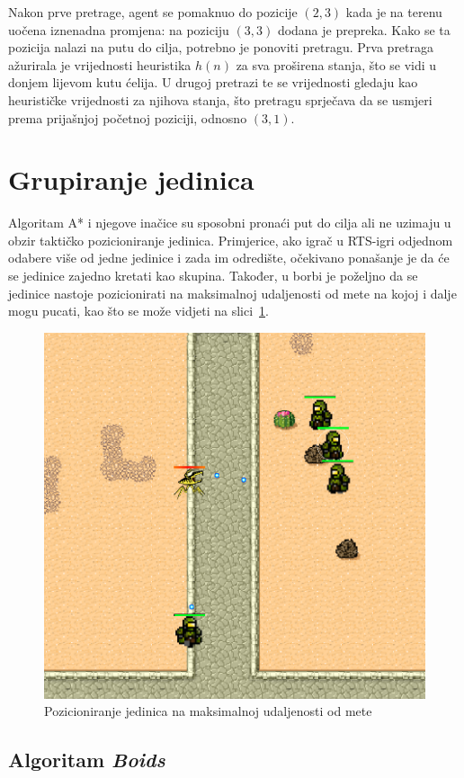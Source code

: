 \documentclass[times, utf8, zavrsni, numeric]{fer}
\begin{document}
\par Nakon prve pretrage, agent se pomaknuo do pozicije \((2, 3)\) kada je na  terenu uočena iznenadna promjena: na poziciju \((3, 3)\) dodana je prepreka.
Kako se ta pozicija nalazi na putu do cilja, potrebno je ponoviti pretragu.
Prva pretraga ažurirala je vrijednosti heuristika \(h(n)\) za sva proširena stanja, što se vidi u donjem lijevom kutu ćelija.
U drugoj pretrazi te se vrijednosti gledaju kao heurističke vrijednosti za njihova stanja, što pretragu sprječava da se usmjeri prema prijašnjoj početnoj poziciji, odnosno \((3, 1)\).

\section{Grupiranje jedinica}\label{sec:grouping}

\par Algoritam A* i njegove inačice su sposobni pronaći put do cilja ali ne uzimaju u obzir taktičko pozicioniranje jedinica. 
Primjerice, ako igrač u RTS-igri odjednom odabere više od jedne jedinice i zada im odredište, očekivano ponašanje je da će se jedinice zajedno kretati kao skupina. 
Također, u borbi je poželjno da se jedinice nastoje pozicionirati na maksimalnoj udaljenosti od mete na kojoj i dalje mogu pucati, kao što se može vidjeti na slici~\ref{fig:enemySeparation}.

\begin{figure}[h]
	\centering
	\includegraphics[width=0.5\linewidth]{images/enemySeparation.png}
	\caption{Pozicioniranje jedinica na maksimalnoj udaljenosti od mete}
	\label{fig:enemySeparation}
\end{figure}

\subsection{Algoritam \textit{Boids}}\label{ssec:boids}
\end{document}
